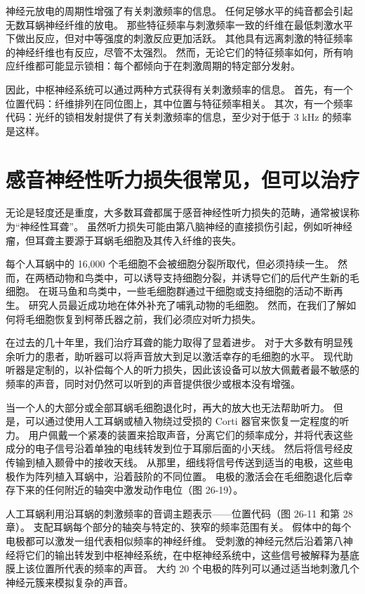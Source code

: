 神经元放电的周期性增强了有关刺激频率的信息。 任何足够水平的纯音都会引起无数耳蜗神经纤维的放电。 那些特征频率与刺激频率一致的纤维在最低刺激水平下做出反应，但对中等强度的刺激反应更加活跃。 其他具有远离刺激的特征频率的神经纤维也有反应，尽管不太强烈。 然而，无论它们的特征频率如何，所有响应纤维都可能显示锁相：每个都倾向于在刺激周期的特定部分发射。

因此，中枢神经系统可以通过两种方式获得有关刺激频率的信息。 首先，有一个位置代码：纤维排列在同位图上，其中位置与特征频率相关。 其次，有一个频率代码：光纤的锁相发射提供了有关刺激频率的信息，至少对于低于 3 kHz 的频率是这样。



\section{感音神经性听力损失很常见，但可以治疗}
无论是轻度还是重度，大多数耳聋都属于感音神经性听力损失的范畴，通常被误称为“神经性耳聋”。 虽然听力损失可能由第八脑神经的直接损伤引起，例如听神经瘤，但耳聋主要源于耳蜗毛细胞及其传入纤维的丧失。

每个人耳蜗中的 16,000 个毛细胞不会被细胞分裂所取代，但必须持续一生。 然而，在两栖动物和鸟类中，可以诱导支持细胞分裂，并诱导它们的后代产生新的毛细胞。 在斑马鱼和鸟类中，一些毛细胞群通过干细胞或支持细胞的活动不断再生。 研究人员最近成功地在体外补充了哺乳动物的毛细胞。 然而，在我们了解如何将毛细胞恢复到柯蒂氏器之前，我们必须应对听力损失。

在过去的几十年里，我们治疗耳聋的能力取得了显着进步。 对于大多数有明显残余听力的患者，助听器可以将声音放大到足以激活幸存的毛细胞的水平。 现代助听器是定制的，以补偿每个人的听力损失，因此该设备可以放大佩戴者最不敏感的频率的声音，同时对仍然可以听到的声音提供很少或根本没有增强。

当一个人的大部分或全部耳蜗毛细胞退化时，再大的放大也无法帮助听力。 但是，可以通过使用人工耳蜗或植入物绕过受损的 Corti 器官来恢复一定程度的听力。 用户佩戴一个紧凑的装置来拾取声音，分离它们的频率成分，并将代表这些成分的电子信号沿着单独的电线转发到位于耳廓后面的小天线。 然后将信号经皮传输到植入颞骨中的接收天线。 从那里，细线将信号传送到适当的电极，这些电极作为阵列植入耳蜗中，沿着鼓阶的不同位置。 电极的激活会在毛细胞退化后幸存下来的任何附近的轴突中激发动作电位（图 26-19）。

人工耳蜗利用沿耳蜗的刺激频率的音调主题表示——位置代码（图 26-11 和第 28 章）。 支配耳蜗每个部分的轴突与特定的、狭窄的频率范围有关。 假体中的每个电极都可以激发一组代表相似频率的神经纤维。 受刺激的神经元然后沿着第八神经将它们的输出转发到中枢神经系统，在中枢神经系统中，这些信号被解释为基底膜上该位置所代表的频率的声音。 大约 20 个电极的阵列可以通过适当地刺激几个神经元簇来模拟复杂的声音。

